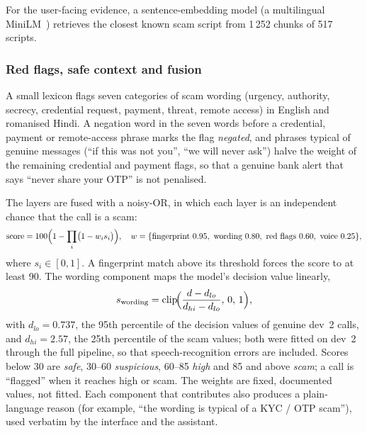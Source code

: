 \documentclass[letterpaper,12pt]{article}
\begin{document}
For the user-facing evidence, a sentence-embedding model (a multilingual MiniLM~\cite{reimers2020multilingual}) retrieves the closest known scam script from 1\,252 chunks of 517 scripts.

\subsubsection{Red flags, safe context and fusion}
A small lexicon flags seven categories of scam wording (urgency, authority, secrecy, credential request, payment, threat, remote access) in English and romanised Hindi. A negation word in the seven words before a credential, payment or remote-access phrase marks the flag \emph{negated}, and phrases typical of genuine messages (``if this was not you'', ``we will never ask'') halve the weight of the remaining credential and payment flags, so that a genuine bank alert that says ``never share your OTP'' is not penalised.

The layers are fused with a noisy-OR, in which each layer is an independent chance that the call is a scam:
\begin{equation}
\text{score} = 100\Bigl(1 - \prod_{i}\bigl(1 - w_i s_i\bigr)\Bigr), \quad w = \{\text{fingerprint } 0.95,\ \text{wording } 0.80,\ \text{red flags } 0.60,\ \text{voice } 0.25\},
\end{equation}
where $s_i\in[0,1]$. A fingerprint match above its threshold forces the score to at least 90. The wording component maps the model's decision value linearly,
\begin{equation}
s_{\text{wording}} = \operatorname{clip}\!\Bigl(\frac{d - d_{lo}}{d_{hi} - d_{lo}},\,0,\,1\Bigr),
\end{equation}
with $d_{lo} = 0.737$, the 95th percentile of the decision values of genuine dev~2 calls, and $d_{hi} = 2.57$, the 25th percentile of the scam values; both were fitted on dev~2 through the full pipeline, so that speech-recognition errors are included. Scores below 30 are \emph{safe}, 30--60 \emph{suspicious}, 60--85 \emph{high} and 85 and above \emph{scam}; a call is ``flagged'' when it reaches high or scam. The weights are fixed, documented values, not fitted. Each component that contributes also produces a plain-language reason (for example, ``the wording is typical of a KYC / OTP scam''), used verbatim by the interface and the assistant.
\end{document}
